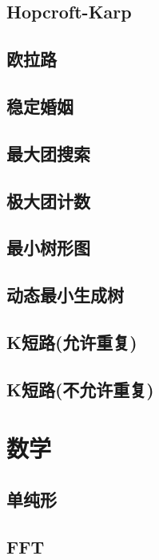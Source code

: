 \documentclass[10pt]{article}
\begin{document}
	\subsection{Hopcroft-Karp}

	\subsection{欧拉路}

	\subsection{稳定婚姻}

	\subsection{最大团搜索}
	
	\subsection{极大团计数}

	\subsection{最小树形图}

	\subsection{动态最小生成树}

	\subsection{K短路(允许重复)}

	\subsection{K短路(不允许重复)}

\section{数学}
	\subsection{单纯形}
	
	\subsection{FFT}
\end{document}
